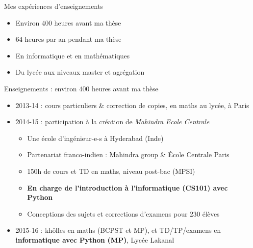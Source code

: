 \documentclass[11pt,english,ignorenonframetext,]{beamer}
\providecommand{\tightlist}{%
  \setlength{\itemsep}{0pt}\setlength{\parskip}{0pt}}
\begin{document}
\begin{frame}{Mes expériences d'enseignements}

\begin{itemize}
\item
Environ $400$ heures avant ma thèse
\vspace*{20pt}
\item
\(64 \) heures par an pendant ma thèse
\vspace*{20pt}
\item
\textcolor{info}{En informatique} et \textcolor{maths}{en mathématiques}
\vspace*{20pt}
\item
Du lycée aux niveaux master et agrégation
\end{itemize}

\end{frame}


\begin{frame}{Enseignements : environ $400$ heures avant ma thèse}

\begin{itemize}
\tightlist
\item
  2013-14 : cours particuliers \& correction de copies, \textcolor{maths}{en maths} au lycée, à Paris
\vspace*{10pt}
\pause
\item
  2014-15 : participation à la création de \emph{Mahindra Ecole Centrale}

  \begin{itemize}
  \tightlist
  \item
    Une école d'ingénieur-e-s à Hyderabad (Inde)
  \item
    Partenariat franco-indien : Mahindra group \& École Centrale Paris
  \item
    \textcolor{maths}{150h de cours et TD en maths, niveau post-bac (MPSI)}
  \item
  \textcolor{info}{\textbf{En charge de l'introduction à l'informatique (CS101) avec Python}}
  \item
    Conceptions des sujets et corrections d'examens pour $230$ élèves
  \end{itemize}

\vspace*{10pt}
\pause
\item
  2015-16 : \textcolor{maths}{khôlles en maths (BCPST et MP)}, et \textcolor{info}{TD/TP/examens en \textbf{informatique avec Python (MP)}}, Lycée Lakanal
\end{itemize}

\end{frame}
\end{document}
